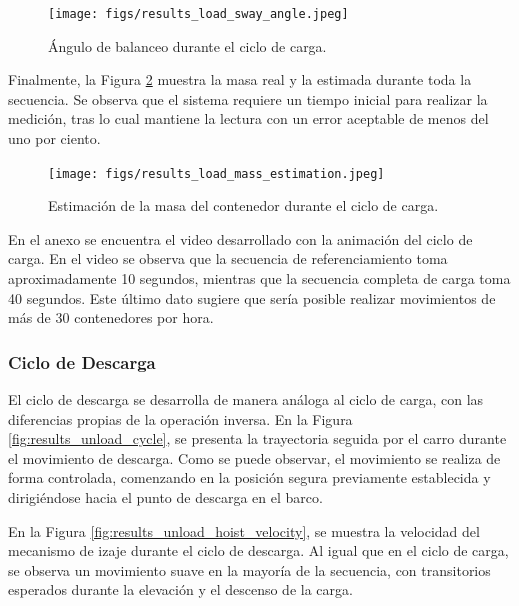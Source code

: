 \documentclass{article}
\begin{document}
            \begin{figure} [H]
                \centering
                \texttt{[image: figs/results\_load\_sway\_angle.jpeg]}
                \caption{Ángulo de balanceo durante el ciclo de carga.}
                \label{fig:results_load_sway_angle}
            \end{figure}

            Finalmente, la Figura \ref{fig:results_load_mass_estimation} muestra la masa real y la estimada durante toda la secuencia. Se observa que el sistema requiere un tiempo inicial para realizar la medición, tras lo cual mantiene la lectura con un error aceptable de menos del uno por ciento.

            \begin{figure} [H]
                \centering
                \texttt{[image: figs/results\_load\_mass\_estimation.jpeg]}
                \caption{Estimación de la masa del contenedor durante el ciclo de carga.}
                \label{fig:results_load_mass_estimation}
            \end{figure}

            En el anexo se encuentra el video desarrollado con la animación del ciclo de carga. En el video se observa que la secuencia de referenciamiento toma aproximadamente 10 segundos, mientras que la secuencia completa de carga toma 40 segundos. Este último dato sugiere que sería posible realizar movimientos de más de 30 contenedores por hora.



            \subsubsection{Ciclo de Descarga}

            El ciclo de descarga se desarrolla de manera análoga al ciclo de carga, con las diferencias propias de la operación inversa. En la Figura \ref{fig:results_unload_cycle}, se presenta la trayectoria seguida por el carro durante el movimiento de descarga. Como se puede observar, el movimiento se realiza de forma controlada, comenzando en la posición segura previamente establecida y dirigiéndose hacia el punto de descarga en el barco.

            En la Figura \ref{fig:results_unload_hoist_velocity}, se muestra la velocidad del mecanismo de izaje durante el ciclo de descarga. Al igual que en el ciclo de carga, se observa un movimiento suave en la mayoría de la secuencia, con transitorios esperados durante la elevación y el descenso de la carga.
\end{document}
